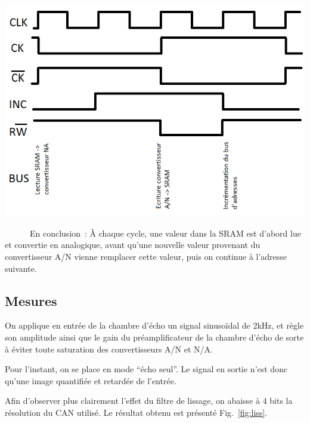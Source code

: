 \documentclass{article}
\begin{document}

\begin{minipage}{0.5\linewidth}
\includegraphics[width=\linewidth]{chronogramme_sequenceur.png}
\end{minipage}\hfill
\begin{minipage}{0.4\linewidth}
~~~~~~En conclusion~: À chaque cycle, une valeur dans la SRAM est d'abord lue et convertie en analogique, avant qu'une nouvelle valeur provenant du convertisseur A/N vienne remplacer cette valeur, puis on continue à l'adresse suivante.
\end{minipage}

\subsection{Mesures}

On applique en entrée de la chambre d'écho un signal sinusoïdal de 2kHz, et règle son amplitude ainsi que le gain du préamplificateur de la chambre d'écho de sorte à éviter toute saturation des convertisseurs A/N et N/A. 

Pour l'instant, on se place en mode ``écho seul''. Le signal en sortie n'est donc qu'une image quantifiée et retardée de l'entrée.


Afin d'observer plus clairement l'effet du filtre de lissage, on abaisse à 4 bits la résolution du CAN utilisé. Le résultat obtenu est présenté Fig.~\ref{fig:liss}.
\end{document}
